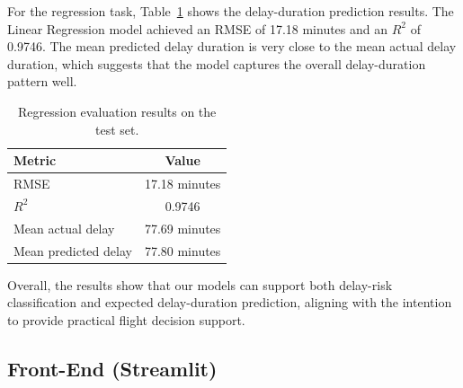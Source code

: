 \begin{table}[t]
\centering
\caption{Classification model comparison on the test set.}
\label{tab:classification_results}
\end{table}

For the regression task, Table~\ref{tab:regression_results} shows the delay-duration prediction results. The Linear Regression model achieved an RMSE of 17.18 minutes and an \(R^2\) of 0.9746. The mean predicted delay duration is very close to the mean actual delay duration, which suggests that the model captures the overall delay-duration pattern well.

\begin{table}[t]
\centering
\caption{Regression evaluation results on the test set.}
\label{tab:regression_results}
\begin{tabular}{lc}
\hline
Metric & Value \\
\hline
RMSE & 17.18 minutes \\
$R^2$ & 0.9746 \\
Mean actual delay & 77.69 minutes \\
Mean predicted delay & 77.80 minutes \\
\hline
\end{tabular}
\end{table}

Overall, the results show that our models can support both delay-risk classification and expected delay-duration prediction, aligning with the intention to provide practical flight decision support.

\subsection{Front-End (Streamlit)}

